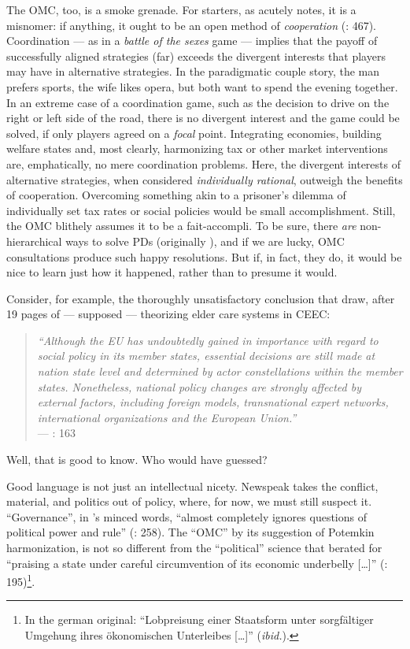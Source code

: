\documentclass[11pt,a4paper,oneside,openright]{article}
\begin{document}
The \gls{OMC}, too, is a smoke grenade. 
For starters, as \citeauthor{Offe2003} acutely notes, it is a misnomer: 
if anything, it ought to be an open method of \emph{cooperation} (\citeyear{Offe2003}: 467). 
Coordination --- as in a \emph{battle of the sexes} game --- implies that the payoff of successfully aligned strategies (far) exceeds the divergent interests that players may have in alternative strategies. 
In the paradigmatic couple story, the man prefers sports, the wife likes opera, but both want to spend the evening together. 
In an extreme case of a coordination game, such as the decision to drive on the right or left side of the road, there is no divergent interest and the game could be solved, if only players agreed on a \emph{focal} point. 
Integrating economies, building welfare states and, most clearly, harmonizing tax or other market interventions are, emphatically, no mere coordination problems. 
Here, the divergent interests of alternative strategies, when considered \emph{individually rational}, outweigh the benefits of cooperation. 
Overcoming something akin to a prisoner's dilemma of individually set tax rates or social policies would be small accomplishment. 
Still, the \gls{OMC} blithely assumes it to be a fait-accompli. 
To be sure, there \emph{are} non-hierarchical ways to solve \glspl{PD} (originally \citealt{Axelrod1980}), and if we are lucky, \gls{OMC} consultations produce such happy resolutions. 
But if, in fact, they do, it would be nice to learn just how it happened, rather than to presume it would. 

Consider, for example, the thoroughly unsatisfactory conclusion that \citeauthor{Theobald2009} draw, after 19 pages of --- supposed --- theorizing elder care systems in \gls{CEEC}:
\begin{quote}
	\emph{``Although the EU has undoubtedly gained in importance with regard to social policy in its member states, essential decisions are still made at nation­ state level and determined by actor constellations within the member states. 
	Nonetheless, national policy changes are strongly affected by external factors, including foreign models, transnational expert networks, international organizations and the European Union.''}\\
	--- \citeyear{Theobald2009}: 163
\end{quote}
Well, that is good to know. 
Who would have guessed?

Good language is not just an intellectual nicety. 
Newspeak takes the conflict, material, and politics out of policy, where, for now, we must still suspect it. 
``Governance'', in \citeauthor{Jachtenfuchs2001}'s minced words, ``almost completely ignores questions of political power and rule'' (\citeyear{Jachtenfuchs2001}: 258). 
The ``\gls{OMC}'' by its suggestion of Potemkin harmonization, is not so different from the ``political'' science that \cite{Agnoli-1989-aa} berated for ``praising a state under careful circumvention of its economic underbelly [\ldots]'' (\citeyear{Agnoli-1989-aa}: 195)\footnote{
	In the german original: 
	``Lobpreisung einer Staatsform unter sorgf\"{a}ltiger Umgehung ihres \"{o}konomischen Unterleibes [\ldots]'' (\emph{ibid.}).}.
\end{document}
